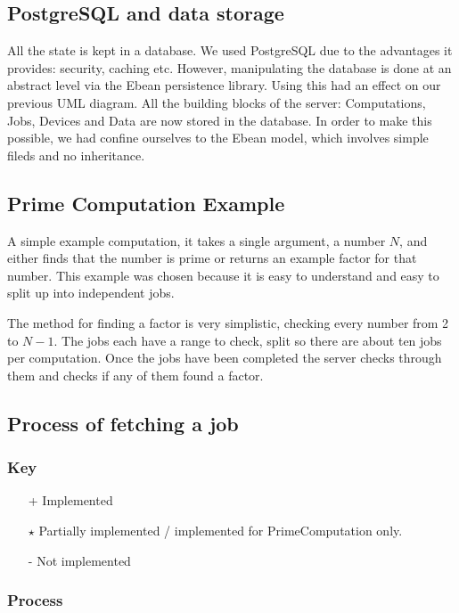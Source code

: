 \documentclass[a4paper,10pt]{article}
\begin{document}
\subsection{PostgreSQL and data storage}
All the state is kept in a database. We used PostgreSQL due to the advantages it provides: security, caching etc. However, manipulating the database is done at an abstract level via the Ebean persistence library. Using this had an effect on our previous UML diagram. All the building blocks of the server: Computations, Jobs, Devices and Data are now stored in the database. In order to make this possible, we had confine ourselves to the Ebean model, which involves simple fileds and no inheritance. 


\subsection{Prime Computation Example}

A simple example computation, it takes a single argument, a number $N$, and either finds that the number is prime or returns an example factor for that number.
This example was chosen because it is easy to understand and easy to split up into independent jobs.

The method for finding a factor is very simplistic, checking every number from 2 to $N-1$. The jobs each have a range to check, split so there are about ten jobs per computation.
Once the jobs have been completed the server checks through them and checks if any of them found a factor.


\subsection{Process of fetching a job}

\subsubsection{Key}
\begin{itemize}
\item[+] Implemented
\item[$\star$] Partially implemented / implemented for PrimeComputation only.
\item[-] Not implemented
\end{itemize}

\subsubsection{Process}
\end{document}
